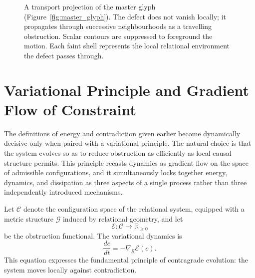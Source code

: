 \documentclass[12pt,a4paper,openany]{book}
\theoremstyle{plain}
\theoremstyle{definition}
\theoremstyle{remark}
\begin{document}
\begin{figure}[h]
\centering
{}
\caption[Propagation glyph, Chapter~6: dynamics]{A transport projection of the master glyph (Figure~\ref{fig:master_glyph}). The defect does not vanish locally; it propagates through successive neighbourhoods as a travelling obstruction. Scalar contours are suppressed to foreground the motion. Each faint shell represents the local relational environment the defect passes through.}
\label{fig:glyph_propagation}
\end{figure}


\section{Variational Principle and Gradient Flow of Constraint}
\label{sec:variational_constraint}

The definitions of energy and contradiction given earlier become dynamically decisive only when paired with a variational principle. The natural choice is that the system evolves so as to reduce obstruction as efficiently as local causal structure permits. This principle recasts dynamics as gradient flow on the space of admissible configurations, and it simultaneously locks together energy, dynamics, and dissipation as three aspects of a single process rather than three independently introduced mechanisms.

Let $\mathcal{C}$ denote the configuration space of the relational system, equipped with a metric structure $\mathcal{G}$ induced by relational geometry, and let
\[
\mathcal{E} : \mathcal{C} \to \mathbb{R}_{\ge 0}
\]
be the obstruction functional. The variational dynamics is
\[
\frac{dc}{dt} = - \nabla_{\mathcal{G}}\mathcal{E}(c).
\]
This equation expresses the fundamental principle of contragrade evolution: the system moves locally against contradiction.
\end{document}
